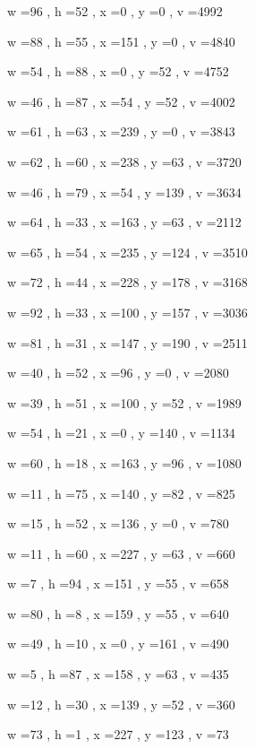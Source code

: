 \documentclass[11pt]{article}
\begin{document}
w =96 , h =52 , x =0 , y =0 , v =4992
\par
w =88 , h =55 , x =151 , y =0 , v =4840
\par
w =54 , h =88 , x =0 , y =52 , v =4752
\par
w =46 , h =87 , x =54 , y =52 , v =4002
\par
w =61 , h =63 , x =239 , y =0 , v =3843
\par
w =62 , h =60 , x =238 , y =63 , v =3720
\par
w =46 , h =79 , x =54 , y =139 , v =3634
\par
w =64 , h =33 , x =163 , y =63 , v =2112
\par
w =65 , h =54 , x =235 , y =124 , v =3510
\par
w =72 , h =44 , x =228 , y =178 , v =3168
\par
w =92 , h =33 , x =100 , y =157 , v =3036
\par
w =81 , h =31 , x =147 , y =190 , v =2511
\par
w =40 , h =52 , x =96 , y =0 , v =2080
\par
w =39 , h =51 , x =100 , y =52 , v =1989
\par
w =54 , h =21 , x =0 , y =140 , v =1134
\par
w =60 , h =18 , x =163 , y =96 , v =1080
\par
w =11 , h =75 , x =140 , y =82 , v =825
\par
w =15 , h =52 , x =136 , y =0 , v =780
\par
w =11 , h =60 , x =227 , y =63 , v =660
\par
w =7 , h =94 , x =151 , y =55 , v =658
\par
w =80 , h =8 , x =159 , y =55 , v =640
\par
w =49 , h =10 , x =0 , y =161 , v =490
\par
w =5 , h =87 , x =158 , y =63 , v =435
\par
w =12 , h =30 , x =139 , y =52 , v =360
\par
w =73 , h =1 , x =227 , y =123 , v =73
\par
\newpage
\end{document}
